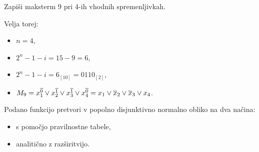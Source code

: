 \begin{zgled}
Zapiši maksterm 9 pri 4-ih vhodnih spremenljivkah.
\end{zgled}
\begin{resitev}
Velja torej:
\begin{itemize}
\item $n=4$,
\item $2^n-1-i=15-9=6$,
\item $2^n-1-i=6_{[10]} = 0110_{[2]}$,
\item $M_9 = x_1^{\overline 0} \vee x_2^{\overline 1} \vee x_3^{\overline 1} \vee x_4^{\overline 0} = x_1 \vee \overline x_2 \vee \overline x_3 \vee x_4$.
\end{itemize}
\end{resitev}

\begin{zgled}
Podano funkcijo pretvori v popolno disjunktivno normalno obliko na dva načina:
\begin{itemize}
\item{s pomočjo pravilnostne tabele},
\item{analitično z razširitvijo}.
\end{itemize}
\end{zgled}

